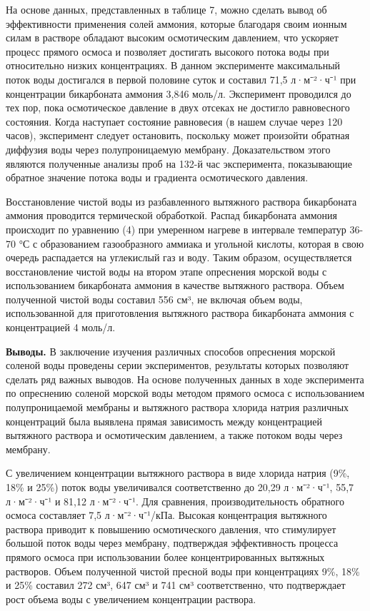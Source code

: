 \begin{multicols}{2}
На основе данных, представленных в таблице 7, можно сделать вывод об
эффективности применения солей аммония, которые благодаря своим ионным
силам в растворе обладают высоким осмотическим давлением, что ускоряет
процесс прямого осмоса и позволяет достигать высокого потока воды при
относительно низких концентрациях. В данном эксперименте максимальный
поток воды достигался в первой половине суток и составил 71,5 л·м⁻²·ч⁻¹
при концентрации бикарбоната аммония 3,846 моль/л. Эксперимент
проводился до тех пор, пока осмотическое давление в двух отсеках не
достигло равновесного состояния. Когда наступает состояние равновесия (в
нашем случае через 120 часов), эксперимент следует остановить, поскольку
может произойти обратная диффузия воды через полупроницаемую мембрану.
Доказательством этого являются полученные анализы проб на 132-й час
эксперимента, показывающие обратное значение потока воды и градиента
осмотического давления.

Восстановление чистой воды из разбавленного вытяжного раствора
бикарбоната аммония проводится термической обработкой. Распад
бикарбоната аммония происходит по уравнению (4) при умеренном нагреве в
интервале температур 36-70 °С с образованием газообразного аммиака и
угольной кислоты, которая в свою очередь распадается на углекислый газ и
воду. Таким образом, осуществляется восстановление чистой воды на втором
этапе опреснения морской воды с использованием бикарбоната аммония в
качестве вытяжного раствора. Объем полученной чистой воды составил 556
см³, не включая объем воды, использованной для приготовления вытяжного
раствора бикарбоната аммония с концентрацией 4 моль/л.

{\bfseries Выводы.} В заключение изучения различных способов опреснения
морской соленой воды проведены серии экспериментов, результаты которых
позволяют сделать ряд важных выводов. На основе полученных данных в ходе
эксперимента по опреснению соленой морской воды методом прямого осмоса с
использованием полупроницаемой мембраны и вытяжного раствора хлорида
натрия различных концентраций была выявлена прямая зависимость между
концентрацией вытяжного раствора и осмотическим давлением, а также
потоком воды через мембрану.

С увеличением концентрации вытяжного раствора в виде хлорида натрия
(9\%, 18\% и 25\%) поток воды увеличивался соответственно до 20,29
л·м⁻²·ч⁻¹, 55,7 л·м⁻²·ч⁻¹ и 81,12 л·м⁻²·ч⁻¹. Для сравнения,
производительность обратного осмоса составляет 7,5 л·м⁻²·ч⁻¹/кПа.
Высокая концентрация вытяжного раствора приводит к повышению
осмотического давления, что стимулирует большой поток воды через
мембрану, подтверждая эффективность процесса прямого осмоса при
использовании более концентрированных вытяжных растворов. Объем
полученной чистой пресной воды при концентрациях 9\%, 18\% и 25\%
составил 272 см³, 647 см³ и 741 см³ соответственно, что подтверждает
рост объема воды с увеличением концентрации раствора.


\end{multicols}
